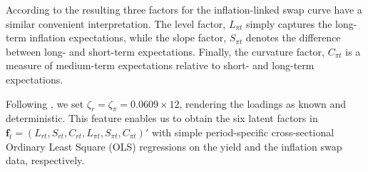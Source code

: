 According to \cite{boraugan2020term} the resulting three factors for the inflation-linked swap curve have a similar convenient interpretation. The level factor, $L_{\pi t}$ simply captures the long-term inflation expectations, while the slope factor, $S_{\pi t}$ denotes the difference between long- and short-term expectations. Finally, the curvature factor, $C_{\pi t}$ is a measure of medium-term expectations relative to short- and long-term expectations. 

Following \cite{DIEBOLD2006337}, we set $\zeta_r = \zeta_{\pi} = 0.0609 \times 12$, rendering the loadings as known and deterministic. This feature enables us to obtain the six latent factors in $\bm f_t = (L_{rt}, S_{rt}, C_{rt}, L_{\pi t}, S_{\pi t}, C_{\pi t})'$ with simple period-specific cross-sectional Ordinary Least Square (OLS) regressions on the yield and the inflation swap data, respectively.


